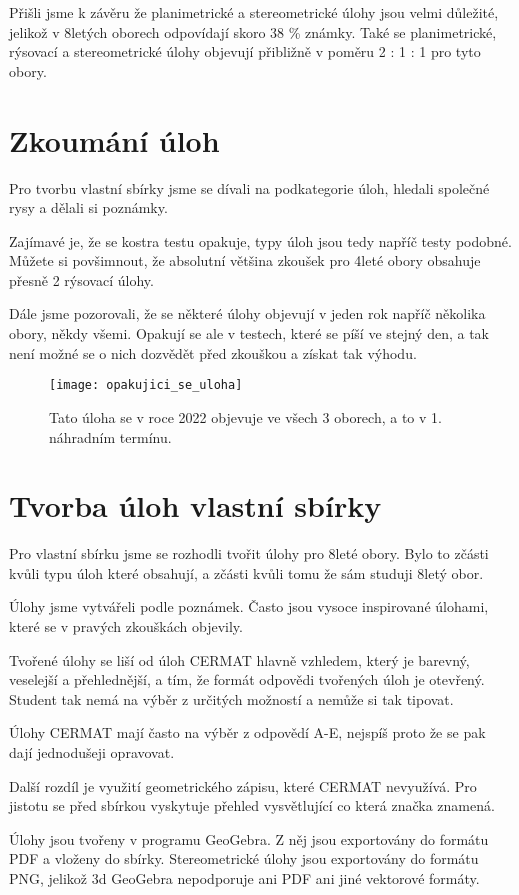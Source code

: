 Přišli jsme k závěru že planimetrické a stereometrické úlohy jsou velmi důležité, jelikož v 8letých oborech odpovídají skoro 38 \% známky. Také se planimetrické, rýsovací a stereometrické úlohy objevují přibližně v poměru 2 : 1 : 1 pro tyto obory.




\section{Zkoumání úloh}

Pro tvorbu vlastní sbírky jsme se dívali na podkategorie úloh, hledali společné rysy a dělali si poznámky.

Zajímavé je, že se kostra testu opakuje, typy úloh jsou tedy napříč testy podobné. Můžete si povšimnout, že absolutní většina zkoušek pro 4leté obory obsahuje přesně 2 rýsovací úlohy.

Dále jsme pozorovali, že se některé úlohy objevují v jeden rok napříč několika obory, někdy všemi. Opakují se ale v testech, které se píší ve stejný den, a tak není možné se o nich dozvědět před zkouškou a získat tak výhodu.


\begin{figure}[h]
    \caption{Tato úloha se v roce 2022 objevuje ve všech 3 oborech, a to v 1. náhradním termínu.}
    \centering
    \texttt{[image: opakujici\_se\_uloha]}
\end{figure}


\section{Tvorba úloh vlastní sbírky}

Pro vlastní sbírku jsme se rozhodli tvořit úlohy pro 8leté obory. Bylo to zčásti kvůli typu úloh které obsahují, a zčásti kvůli tomu že sám studuji 8letý obor.

Úlohy jsme vytvářeli podle poznámek. Často jsou vysoce inspirované úlohami, které se v pravých zkouškách objevily.

Tvořené úlohy se liší od úloh CERMAT hlavně vzhledem, který je barevný, veselejší a přehlednější, a tím, že formát odpovědi tvořených úloh je otevřený. Student tak nemá na výběr z určitých možností a nemůže si tak tipovat.

Úlohy CERMAT mají často na výběr z odpovědí A-E, nejspíš proto že se pak dají jednodušeji opravovat.

Další rozdíl je využití geometrického zápisu, které CERMAT nevyužívá. Pro jistotu se před sbírkou vyskytuje přehled vysvětlující co která značka znamená.

Úlohy jsou tvořeny v programu GeoGebra. Z něj jsou exportovány do formátu PDF a vloženy do sbírky. Stereometrické úlohy jsou exportovány do formátu PNG, jelikož 3d GeoGebra nepodporuje ani PDF ani jiné vektorové formáty.
